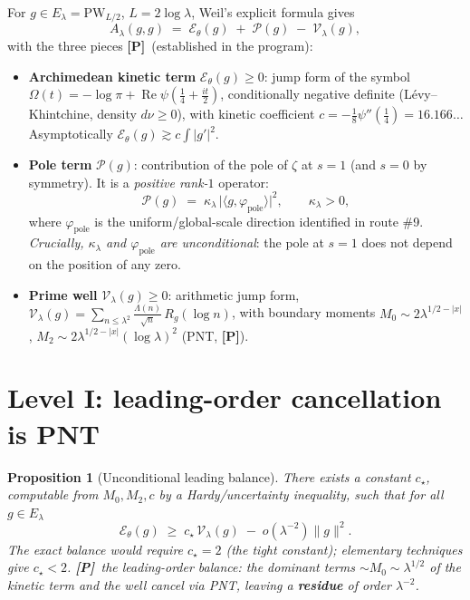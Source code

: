 \documentclass[11pt]{article}
\newcommand{\PR}{\textcolor{green!55!black}{\textbf{[P]}}}
\theoremstyle{plain}
\newtheorem{proposition}{Proposition}
\theoremstyle{definition}
\newcommand{\Lam}{\Lambda}
\newcommand{\El}{E_\lambda}
\newcommand{\kin}{\mathcal E_\theta}
\newcommand{\pole}{\mathcal P}
\newcommand{\vv}{\mathcal V}
\DeclareMathOperator{\Real}{Re}
\begin{document}
For $g\in\El=\mathrm{PW}_{L/2}$, $L=2\log\lambda$, Weil's explicit formula gives
\begin{equation}\label{eq:three}
  A_\lambda(g,g)
  \;=\;\kin(g)\;+\;\pole(g)\;-\;\vv_\lambda(g),
\end{equation}
with the three pieces \PR\ (established in the program):
\begin{itemize}[leftmargin=1.4em]
\item \textbf{Archimedean kinetic term} $\kin(g)\ge0$: jump form of the symbol
$\Omega(t)=-\log\pi+\Real\psi(\tfrac14+\tfrac{it}{2})$, conditionally negative
definite (Lévy--Khintchine, density $d\nu\ge0$), with kinetic coefficient
$c=-\tfrac18\psi''(\tfrac14)=16.166\ldots$ Asymptotically
$\kin(g)\gtrsim c\!\int|g'|^2$.
\item \textbf{Pole term} $\pole(g)$: contribution of the pole of $\zeta$ at $s=1$
(and $s=0$ by symmetry). It is a \emph{positive rank-$1$} operator:
\begin{equation}\label{eq:pole}
  \pole(g)\;=\;\kappa_\lambda\,\bigl|\langle g,\varphi_{\mathrm{pole}}\rangle\bigr|^2,
  \qquad \kappa_\lambda>0,
\end{equation}
where $\varphi_{\mathrm{pole}}$ is the uniform/global-scale direction identified
in route \#9. \emph{Crucially, $\kappa_\lambda$ and $\varphi_{\mathrm{pole}}$ are
unconditional}: the pole at $s=1$ does not depend on the position of any zero.
\item \textbf{Prime well} $\vv_\lambda(g)\ge0$: arithmetic jump form,
$\vv_\lambda(g)=\sum_{n\le\lambda^2}\frac{\Lam(n)}{\sqrt n}\,R_g(\log n)$, with
boundary moments $M_0\sim2\lambda^{1/2-|x|}$, $M_2\sim2\lambda^{1/2-|x|}(\log\lambda)^2$
(PNT, \PR).
\end{itemize}

\section{Level I: leading-order cancellation is PNT}\label{sec:leading}

\begin{proposition}[Unconditional leading balance]\label{prop:leading}
There exists a constant $c_\star$, computable from $M_0,M_2,c$ by a Hardy/uncertainty
inequality, such that for all $g\in\El$
\begin{equation}\label{eq:hardy}
  \kin(g)\;\ge\;c_\star\,\vv_\lambda(g)\;-\;o\!\left(\lambda^{-2}\right)\|g\|^2 .
\end{equation}
The \emph{exact} balance would require $c_\star=2$ (the tight constant); elementary
techniques give $c_\star<2$. \PR\ the leading-order balance: the dominant terms
$\sim M_0\sim\lambda^{1/2}$ of the kinetic term and the well cancel via PNT, leaving a
\textbf{residue} of order $\lambda^{-2}$.
\end{proposition}
\end{document}

